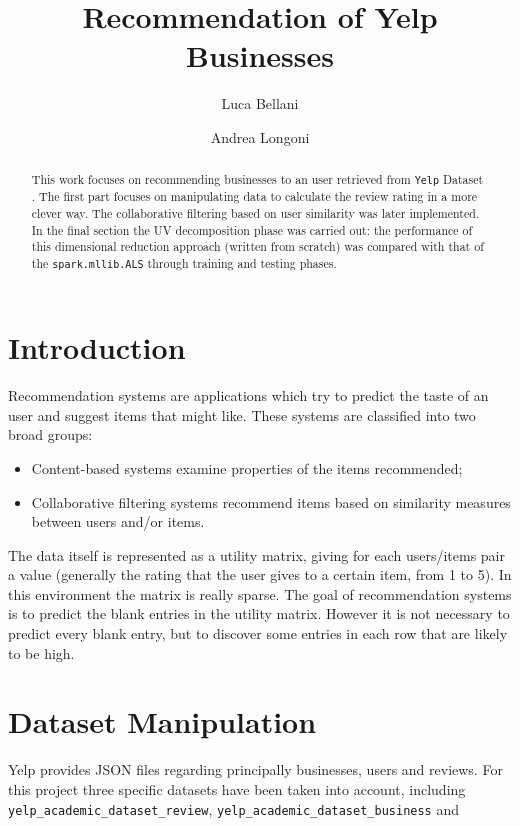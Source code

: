 \documentclass{article}
\begin{document}
\title{\textbf{Recommendation of Yelp Businesses}}
\author{Luca Bellani}
\author{Andrea Longoni}
\date{}

\maketitle


\begin{abstract}
	This work focuses on recommending businesses to an user retrieved from \texttt{Yelp} Dataset \cite{datasetKaggle}. The first part focuses on manipulating data to calculate the review rating in a more clever way. The collaborative filtering based on user similarity was later implemented. In the final section the UV decomposition phase was carried out: the performance of this dimensional reduction approach (written from scratch) was compared with that of the  \texttt{spark.mllib.ALS} \cite{als} through training and testing phases.
 
\end{abstract}
    

\section{Introduction}
Recommendation systems are applications which try to predict the taste of an user and suggest items that might like. These systems are classified into two broad groups:
\begin{itemize}
    \item Content-based systems examine properties of the items recommended;
    \item Collaborative filtering systems recommend items based on similarity measures between users and/or items.
\end{itemize}

The data itself is represented as a utility matrix, giving for each users/items pair a value (generally the rating that the user gives to a certain item, from 1 to 5). In this environment the matrix is really sparse. The goal of recommendation systems is to predict the blank entries in the utility matrix. However it is not necessary to predict every blank entry, but to discover some entries in each row that are likely to be high. 
\section{Dataset Manipulation}
Yelp provides JSON files regarding principally businesses, users and reviews. For this project three specific datasets have been taken into account, including \texttt{yelp\_academic\_dataset\_review}, \texttt{yelp\_academic\_dataset\_business} and 
\end{document}

